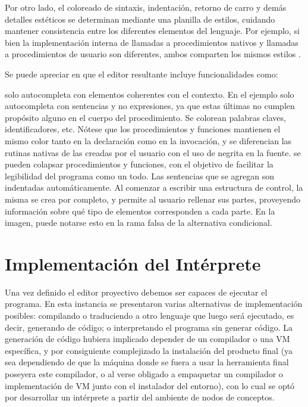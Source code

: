 \centertree{
  [BinaryOperation
    [{Plus(alias='+')}]
    [{Div(alias='/')}]
    [...]
  ]  
}

Por otro lado, el coloreado de sintaxis, indentación, retorno de carro y demás detalles estéticos se determinan mediante una planilla de estilos, cuidando mantener consistencia entre los diferentes elementos del lenguaje. Por ejemplo, si bien la implementación interna de llamadas a procedimientos nativos y llamadas a procedimientos de usuario son diferentes, ambos comparten los mismos estilos .


Se puede apreciar en  que el editor resultante incluye funcionalidades como:
\begin{itemize}
 solo autocompleta con elementos coherentes con el contexto. En el ejemplo solo autocompleta con sentencias y no expresiones, ya que estas últimas no cumplen propósito alguno en el cuerpo del procedimiento.
 Se colorean palabras claves, identificadores, etc. Nótese que los procedimientos y funciones mantienen el mismo color tanto en la declaración como en la invocación, y se diferencian las rutinas nativas de las creadas por el usuario con el uso de negrita en la fuente.
 se pueden colapsar procedimientos y funciones, con el objetivo de facilitar la legibilidad del programa como un todo.
 Las sentencias que se agregan son indentadas automáticamente.
 Al comenzar a escribir una estructura de control, la misma se crea por completo, y permite al usuario rellenar sus partes, proveyendo información sobre qué tipo de elementos corresponden a cada parte. En la imagen, puede notarse esto en la rama falsa de la alternativa condicional.
\end{itemize}




\section{Implementación del Intérprete}\label{interprete}

Una vez definido el editor proyectivo debemos ser capaces de ejecutar el programa. En esta instancia se presentaron varias alternativas de implementación posibles: compilando o traduciendo a otro lenguaje que luego será ejecutado, es decir, generando de código; o interpretando el programa sin generar código. La generación de código hubiera implicado depender de un compilador o una VM específica, y por consiguiente complejizado la instalación del producto final (ya sea dependiendo de que la máquina donde se fuera a usar la herramienta final poseyera este compilador, o al verse obligado a empaquetar un compilador o implementación de VM junto con el instalador del entorno), con lo cual se optó por desarrollar un intérprete a partir del ambiente de nodos de conceptos.

